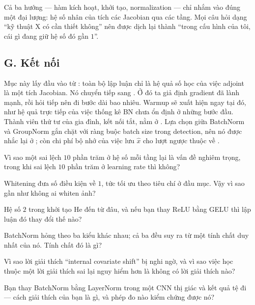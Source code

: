 \documentclass[../../../deep_learning.tex]{subfiles}
\begin{document}
\begin{cannho}
Cả ba hướng --- hàm kích hoạt, khởi tạo, normalization --- chỉ nhắm vào đúng một đại lượng: hệ số nhân của tích các Jacobian qua các tầng. Mọi câu hỏi dạng ``kỹ thuật X có cần thiết không'' nên được dịch lại thành ``trong cấu hình của tôi, cái gì đang giữ hệ số đó gần \(1\)''. 
\end{cannho}

\subsection{G. Kết nối}
Mục này lấy đầu vào từ : toàn bộ lập luận chỉ là hệ quả số học của việc adjoint là một tích Jacobian. Nó chuyển tiếp sang . Ở đó ta giả định gradient đã lành mạnh, rồi hỏi tiếp nên đi bước dài bao nhiêu. Warmup sẽ xuất hiện ngay tại đó, như hệ quả trực tiếp của việc thống kê BN chưa ổn định ở những bước đầu. Thành viên thứ tư của gia đình, kết nối tắt, nằm ở . Lựa chọn giữa BatchNorm và GroupNorm gắn chặt với ràng buộc batch size trong detection, nên nó được nhắc lại ở ; còn chi phí bộ nhớ của việc lưu \(\hat x\) cho lượt ngược thuộc về .

\begin{tukiem}
\item Vì sao một sai lệch \(10\) phần trăm ở hệ số mỗi tầng lại là vấn đề nghiêm trọng, trong khi sai lệch \(10\) phần trăm ở learning rate thì không?
\item Whitening đưa số điều kiện về \(1\), tức tối ưu theo tiêu chí ở đầu mục. Vậy vì sao gần như không ai whiten ảnh?
\item Hệ số \(2\) trong khởi tạo He đến từ đâu, và nếu bạn thay ReLU bằng GELU thì lập luận đó thay đổi thế nào?
\item BatchNorm hỏng theo ba kiểu khác nhau; cả ba đều suy ra từ một tính chất duy nhất của nó. Tính chất đó là gì?
\item Vì sao lời giải thích ``internal covariate shift'' bị nghi ngờ, và vì sao việc học thuộc một lời giải thích sai lại nguy hiểm hơn là không có lời giải thích nào?
\item Bạn thay BatchNorm bằng LayerNorm trong một CNN thị giác và kết quả tệ đi --- cách giải thích của bạn là gì, và phép đo nào kiểm chứng được nó?
\end{tukiem}
\ifSubfilesClassLoaded{\printbibliography[title={Nguồn}]}{}
\end{document}
